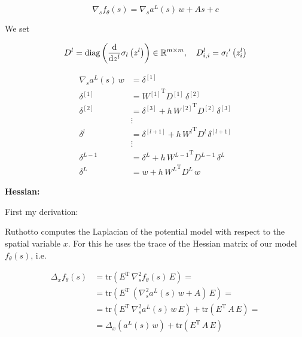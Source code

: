 \begin{equation*}
    \nabla_s f_{\theta}\left(s\right) = \nabla_s a^{L}\left(s\right) \, w + A s + c
\end{equation*}

We set

\begin{equation*}
    D^{l} = \mathrm{diag} \left( \frac{\textup{d}}{\textup{d}z^{l}} \sigma_{l} \left(z^{l}\right) \right) \in \mathbb{R}^{m \times m}, \quad D_{i, i}^{l} = {\sigma_{l}}^{\prime} \left(z_{i}^{l}\right)
\end{equation*}

\begin{align*}
    \nabla_s a^{L}\left(s\right) \, w & = \delta^{[1]}  \\
    \delta^{[1]} & = {W^{[1]}}^{\mathrm{T}} D^{[1]} \, \delta^{[2]} \\
    \delta^{[2]} & = \delta^{[3]} + h \, {W^{[2]}}^{\mathrm{T}} D^{[2]} \, \delta^{[3]} \\
    &\vdots\\
    \delta^{l} & = \delta^{[l+1]} + h \, {W^{l}}^{\mathrm{T}} D^{l} \, \delta^{[l+1]} \\
    &\vdots\\
    \delta^{L-1} & = \delta^{L} + h \, {W^{L-1}}^{\mathrm{T}} D^{L-1} \, \delta^{L} \\
    \delta^{L} & = w + h \, {W^{L}}^{\mathrm{T}} D^{L} \, w
\end{align*}


\textbf{Hessian:}

First my derivation:

Ruthotto computes the Laplacian of the potential model with respect to the spatial variable $x$. For this he uses the trace of the Hessian matrix of our model $f_{\theta}\left(s\right)$, i.e. 

\begin{align*}
    \Delta_x f_{\theta}\left(s\right) & = \mathrm{tr}\left(E^{\mathrm{T}} \, \nabla^{2}_s f_{\theta}\left(s\right) \, E\right) = \\
    & = \mathrm{tr}\left(E^{\mathrm{T}} \, \left(\nabla^{2}_s a^{L}\left(s\right) \, w + A\right) \, E\right) = \\
    & = \mathrm{tr}\left(E^{\mathrm{T}} \, \nabla^{2}_s a^{L}\left(s\right) \, w \, E\right) + \mathrm{tr}\left(E^{\mathrm{T}} \,  A \, E\right) = \\
    & = \Delta_x \left(a^{L}\left(s\right) \, w\right) + \mathrm{tr}\left(E^{\mathrm{T}} \,  A \, E\right)
\end{align*}

